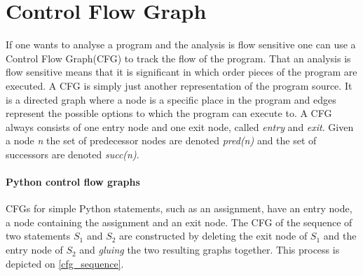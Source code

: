 \section{Control Flow Graph}\label{control_flow_graph}
If one wants to analyse a program and the analysis is flow sensitive one can use a Control Flow Graph(CFG) to track the flow of the program.
That an analysis is flow sensitive means that it is significant in which order pieces of the program are executed.
A CFG is simply just another representation of the program source.
It is a directed graph where a node is a specific place in the program and edges represent the possible options to which the program can execute to.
A CFG always consists of one entry node and one exit node, called \textit{entry} and \textit{exit}.
Given a node \textit{n} the set of predecessor nodes are denoted \textit{pred(n)} and the set of successors are denoted \textit{succ(n)}.

\paragraph{Python control flow graphs}
CFGs for simple Python statements, such as an assignment, have an entry node, a node containing the assignment and an exit node.
The CFG of the sequence of two statements $S_1$ and $S_2$ are constructed by deleting the exit node of $S_1$ and the entry node of $S_2$ and \emph{gluing} the two resulting graphs together.
This process is depicted on \cref{cfg_sequence}.

